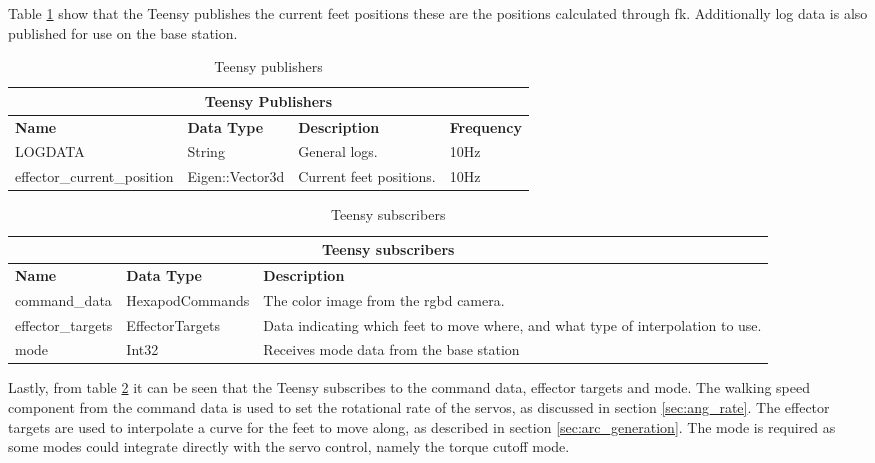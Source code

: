         Table \ref{tab:teensy_pubs} show that the Teensy publishes the current feet positions these are the positions calculated through \ac{fk}. Additionally
        log data is also published for use on the base station.
        \begin{table}[h]
            \begin{tabularx}{\textwidth}{| l | l | X | l |}
                \hline
                \multicolumn{4}{|c|}{\textbf{Teensy Publishers}} \\ \hline
                \textbf{Name} & \textbf{Data Type} & \textbf{Description} & \textbf{Frequency} \\ \hline
                LOGDATA & String & General logs. & 10Hz \\ \hline
                effector\_current\_position & Eigen::Vector3d & Current feet positions. & 10Hz \\ \hline
            \end{tabularx}
            \caption{Teensy publishers}
            \label{tab:teensy_pubs}
        \end{table}
        \begin{table}[h]
            \centering
            \begin{tabularx}{\textwidth}{| l | l | X |}
                \hline
                \multicolumn{3}{|c|}{\textbf{Teensy subscribers}} \\ \hline
                \textbf{Name} & \textbf{Data Type} & \textbf{Description} \\ \hline
                command\_data & HexapodCommands & The color image from the \ac{rgbd} camera. \\ \hline
                effector\_targets & EffectorTargets & Data indicating which feet to move where, and what type of interpolation to use.\\ \hline
                mode & Int32 & Receives mode data from the base station \\ \hline
            \end{tabularx}
            \caption{Teensy subscribers}
            \label{tab:teensy_subs}
        \end{table}

        Lastly, from table \ref{tab:teensy_subs} it can be seen that the Teensy subscribes to the command data, effector targets and mode.
        The walking speed component from the command data is used to set the rotational rate of the servos, as discussed in section \ref{sec:ang_rate}.
        The effector targets are used to interpolate a curve for the feet to move along, as described in section \ref{sec:arc_generation}. The mode is required
        as some modes could integrate directly with the servo control, namely the torque cutoff mode.

